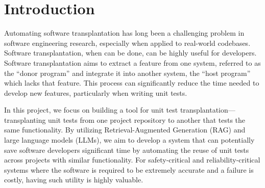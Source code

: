 \documentclass[sigconf]{acmart}
\begin{document}



\maketitle

\section{Introduction}
Automating software transplantation has long been a challenging problem in software engineering research, especially when applied to real-world codebases. Software transplantation, when can be done, can be highly useful for developers. Software transplantation aims to extract a feature from one system, referred to as the ``donor program'' and integrate it into another system, the ``host program'' which lacks that feature. This process can significantly reduce the time needed to develop new features, particularly when writing unit tests.

In this project, we focus on building a tool for unit test transplantation—transplanting unit tests from one project repository to another that tests the same functionality. By utilizing Retrieval-Augmented Generation (RAG) and large language models (LLMs), we aim to develop a system that can potentially save software developers significant time by automating the reuse of unit tests across projects with similar functionality. For safety-critical and reliability-critical systems where the software is required to be extremely accurate and a failure is costly, having such utility is highly valuable.
\end{document}

